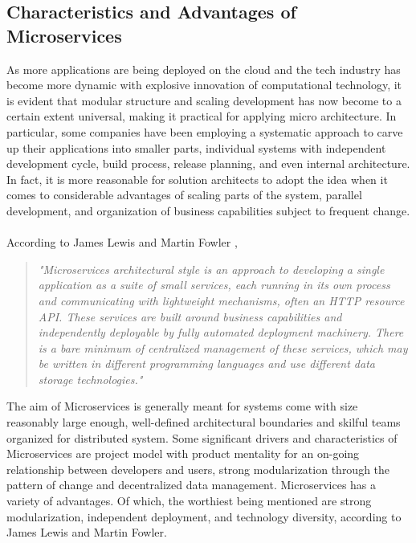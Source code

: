 \documentclass[a4paper]{book}
\begin{document}
\subsection{Characteristics and Advantages of Microservices} \label{Characteristics and Advantages of Microservices}
As more applications are being deployed on the cloud and the tech industry has become more dynamic with explosive innovation of computational technology, it is evident that modular structure and scaling development has now become to a certain extent universal, making it practical for applying micro architecture. In particular, some companies have been employing a systematic approach to carve up their applications into smaller parts, individual systems with independent development cycle, build process, release planning, and even internal architecture. In fact, it is more reasonable for solution architects to adopt the idea when it comes to considerable advantages of scaling parts of the system, parallel development, and organization of business capabilities subject to frequent change. 
\\ \\
According to James Lewis and Martin Fowler , 
\begin{quote}
    \textit{"Microservices architectural style is an approach to developing a single application as a suite of small services, each running in its own process and communicating with lightweight mechanisms, often an HTTP resource API. These services are built around business capabilities and independently deployable by fully automated deployment machinery. There is a bare minimum of centralized management of these services, which may be written in different programming languages and use different data storage technologies."} \cite{Lew14}
\end{quote}
The aim of Microservices is generally meant for systems come with size reasonably large enough, well-defined architectural boundaries \cite{BoundedContext} and skilful teams organized for distributed system. Some significant drivers and characteristics of Microservices are project model with product mentality for an on-going relationship between developers and users, strong modularization through the pattern of change and decentralized data management. Microservices has a variety of advantages. Of which, the worthiest being mentioned are strong modularization, independent deployment, and technology diversity, according to James Lewis and Martin Fowler. \cite{Lew14}
\end{document}
